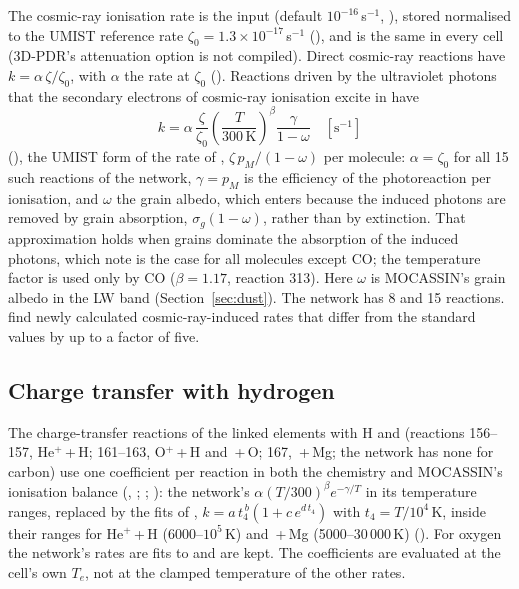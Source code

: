 The cosmic-ray ionisation rate is the input  (default
$10^{-16}$\,s$^{-1}$, ), stored normalised to the
UMIST reference rate $\zeta_0=1.3\times10^{-17}$\,s$^{-1}$ (),
and is the same in every cell (3D-PDR's attenuation option 
is not compiled). Direct cosmic-ray reactions have $k=\alpha\,\zeta/\zeta_0$, with
$\alpha$ the rate at $\zeta_0$ (). Reactions
driven by the ultraviolet photons that the secondary electrons of
cosmic-ray ionisation excite in \Htwo{} \citep{PrasadTarafdar1983} have
\begin{equation}
  k = \alpha\,\frac{\zeta}{\zeta_0}\left(\frac{T}{300\,\mathrm K}\right)^{\beta}\frac{\gamma}{1-\omega}
  \quad[\mathrm{s^{-1}}]
  \label{eq:crphot}
\end{equation}
(), the UMIST form of the rate of
\citet[their eq.~7]{Gredel1989}, $\zeta\,p_M/(1-\omega)$ per molecule: $\alpha=\zeta_0$ for
all 15 such reactions of the network, $\gamma=p_M$ is the efficiency of the
photoreaction per ionisation, and $\omega$ the grain albedo, which enters because
the induced photons are removed by grain absorption, $\sigma_g(1-\omega)$, rather
than by extinction. That approximation holds when grains dominate the
absorption of the induced photons, which \citet{Gredel1989} note is the case
for all molecules except CO; the temperature factor is used only by CO
($\beta=1.17$, reaction 313). Here $\omega$ is MOCASSIN's grain albedo in the LW
band (Section~\ref{sec:dust}). The network has 8  and 15 
reactions. \citet{Heays2017} find newly calculated cosmic-ray-induced rates
that differ from the standard values by up to a factor of five.

\subsection{Charge transfer with hydrogen}
\label{sec:ct}

The charge-transfer reactions of the linked elements with H and \Hp{}
(reactions 156--157, He$^+$\,+\,H; 161--163, O$^+$\,+\,H and \Hp\,+\,O; 167,
\Hp\,+\,Mg; the network has none for carbon) use one coefficient per reaction
in both the chemistry and MOCASSIN's ionisation balance (,
; ; ): the
network's $\alpha(T/300)^\beta e^{-\gamma/T}$ in its temperature ranges, replaced by the
fits of \citet{KingdonFerland1996}, $k=a\,t_4^{\,b}(1+c\,e^{d\,t_4})$ with $t_4=T/10^4$\,K,
inside their ranges for He$^+$\,+\,H (6000--$10^5$\,K) and \Hp\,+\,Mg
(5000--30\,000\,K) (). For oxygen the network's rates
are fits to \citet{Stancil1999} and are kept. The coefficients are evaluated
at the cell's own $T_e$, not at the clamped temperature of the other rates.

